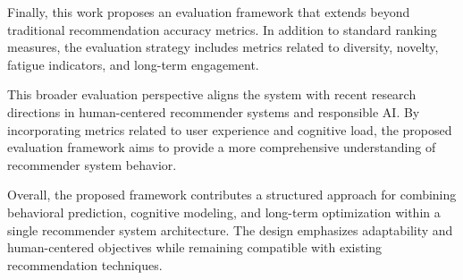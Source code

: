 Finally, this work proposes an evaluation framework that extends beyond traditional recommendation accuracy metrics.
In addition to standard ranking measures, the evaluation strategy includes metrics related to diversity, novelty, fatigue indicators, and long-term engagement.

This broader evaluation perspective aligns the system with recent research directions in human-centered recommender systems and responsible AI.
By incorporating metrics related to user experience and cognitive load, the proposed evaluation framework aims to provide a more comprehensive understanding of recommender system behavior.

Overall, the proposed framework contributes a structured approach for combining behavioral prediction, cognitive modeling, and long-term optimization within a single recommender system architecture.
The design emphasizes adaptability and human-centered objectives while remaining compatible with existing recommendation techniques.

